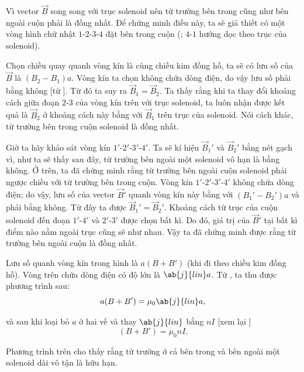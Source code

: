 Vì vector $\vec{B}$ song song với trục solenoid nên từ trường bên trong cũng như bên ngoài cuộn phải là đồng nhất. Để chứng minh điều này, ta sẽ giả thiết có một vòng hình chữ nhật $1$-$2$-$3$-$4$ đặt bên trong cuộn (; $4$-$1$ hướng dọc theo trục của solenoid).

Chọn chiều quay quanh vòng kín là cùng chiều kim đồng hồ, ta sẽ có lưu số của $\vec{B}$ là $(B_2 - B_1)a$. Vòng kín ta chọn không chứa dòng điện, do vậy lưu số phải bằng không [từ ]. Từ đó ta suy ra $\vec{B}_1 = \vec{B}_2$. Ta thấy rằng khi ta thay đổi khoảng cách giữa đoạn $2$-$3$ của vòng kín trên với trục solenoid, ta luôn nhận được kết quả là $\vec{B}_2$ ở khoảng cách này bằng với $\vec{B}_1$ trên trục của solenoid. Nói cách khác, từ trường bên trong cuộn solenoid là đồng nhất.

Giờ ta hãy khảo sát vòng kín $1'$-$2'$-$3'$-$4'$. Ta sẽ kí hiệu $\vec{B}_1'$ và $\vec{B}_2'$ bằng nét gạch vì, như ta sẽ thấy sau đây, từ trường bên ngoài một solenoid vô hạn là bằng không. Ở trên, ta đã chứng minh rằng từ trường bên ngoài cuộn solenoid phải ngược chiều với từ trường bên trong cuộn. Vòng kín $1'$-$2'$-$3'$-$4'$ không chứa dòng điện; do vậy, lưu số của vector $\vec{B}'$ quanh vòng kín này bằng với $(B_1' - B_2')a$ và phải bằng không. Từ đây ta được $\vec{B}_1'=\vec{B}_2'$.
Khoảng cách từ trục của cuộn solenoid đến đoạn $1'$-$4'$ và $2'$-$3'$ được chọn bất kì. Do đó, giá trị của $\vec{B}'$ tại bất kì điểm nào nằm ngoài trục cũng sẽ như nhau. Vậy ta đã chứng minh được rằng từ trường bên ngoài cuộn là đồng nhất.

Lưu số quanh vòng kín trong hình  là $a(B+B')$ (khi đi theo chiều kim đồng hồ). Vòng trên chứa dòng điện có độ lớn là $\ab{j}{lin}a$. Từ , ta thu được phương trình sau:
\begin{equation*}
    a(B+B') = \mu_0 \ab{j}{lin} a,
\end{equation*}

\noindent
và sau khi loại bỏ $a$ ở hai vế và thay $\ab{j}{lin}$ bằng $nI$ [xem lại ]
\begin{equation}\label{eq:6_107}
    (B+B') = \mu_0 n I.
\end{equation}

\noindent
Phương trình trên cho thấy rằng từ trường ở cả bên trong và bên ngoài một solenoid dài vô tận là hữu hạn.

